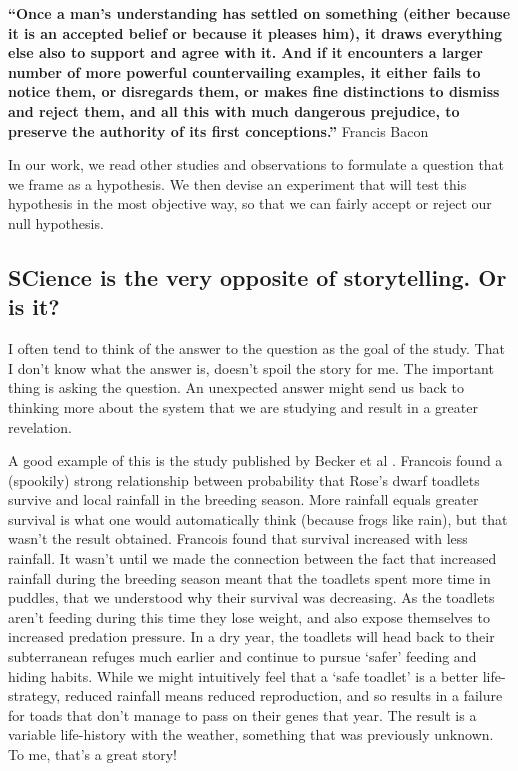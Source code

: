 \documentclass[
]{krantz}
\renewenvironment{quote}{\begin{VF}}{\end{VF}}
\begin{document}
\begin{quote}
\textbf{``Once a man's understanding has settled on something (either because it is an accepted belief or because it pleases him), it draws everything else also to support and agree with it. And if it encounters a larger number of more powerful countervailing examples, it either fails to notice them, or disregards them, or makes fine distinctions to dismiss and reject them, and all this with much dangerous prejudice, to preserve the authority of its first conceptions.''}
Francis Bacon \citeyearpar{bacon1620novum}
\end{quote}

In our work, we read other studies and observations to formulate a question that we frame as a hypothesis. We then devise an experiment that will test this hypothesis in the most objective way, so that we can fairly accept or reject our null hypothesis.

\hypertarget{science-is-the-very-opposite-of-storytelling.-or-is-it}{%
\subsection{SCience is the very opposite of storytelling. Or is it?}\label{science-is-the-very-opposite-of-storytelling.-or-is-it}}

I often tend to think of the answer to the question as the goal of the study. That I don't know what the answer is, doesn't spoil the story for me. The important thing is asking the question. An unexpected answer might send us back to thinking more about the system that we are studying and result in a greater revelation.

A good example of this is the study published by Becker et al \citeyearpar{becker2018extreme}. Francois found a (spookily) strong relationship between probability that Rose's dwarf toadlets survive and local rainfall in the breeding season. More rainfall equals greater survival is what one would automatically think (because frogs like rain), but that wasn't the result obtained. Francois found that survival increased with less rainfall. It wasn't until we made the connection between the fact that increased rainfall during the breeding season meant that the toadlets spent more time in puddles, that we understood why their survival was decreasing. As the toadlets aren't feeding during this time they lose weight, and also expose themselves to increased predation pressure. In a dry year, the toadlets will head back to their subterranean refuges much earlier and continue to pursue `safer' feeding and hiding habits. While we might intuitively feel that a `safe toadlet' is a better life-strategy, reduced rainfall means reduced reproduction, and so results in a failure for toads that don't manage to pass on their genes that year. The result is a variable life-history with the weather, something that was previously unknown. To me, that's a great story!
\end{document}
